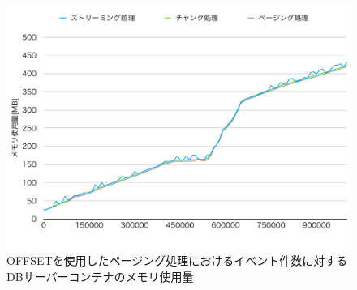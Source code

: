 \documentclass[../../../../../main]{subfiles}
\begin{document}
    \begin{figure}[H]
        \centering
        \includegraphics[width=12cm]{graph}
        \caption{OFFSETを使用したページング処理におけるイベント件数に対するDBサーバーコンテナのメモリ使用量}
        \label{fig:each-way-db-mem-app_1_1024-db_1_1024}
    \end{figure}
\end{document}
